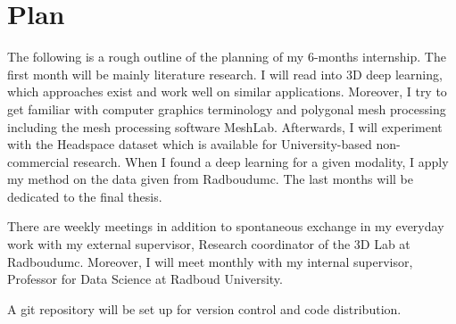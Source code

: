 \documentclass{article}
\begin{document}
 \section{Plan}
The following is a rough outline of the planning of my 6-months internship. The first month will be mainly literature research. I will read into 3D deep learning, which approaches exist and work well on similar applications. Moreover, I try to get familiar with computer graphics terminology and polygonal mesh processing including the mesh processing software MeshLab. Afterwards, I will experiment with the Headspace dataset which is available for University-based non-commercial research. When I found a deep learning for a given modality, I apply my method on the data given from Radboudumc. The last months will be dedicated to the final thesis.

There are weekly meetings in addition to spontaneous exchange in my everyday work with my external supervisor, Research coordinator
of the 3D Lab at Radboudumc. Moreover, I will meet monthly with my internal supervisor, Professor for Data Science at Radboud University.

A git repository will be set up for version control and code distribution.



\end{document}
